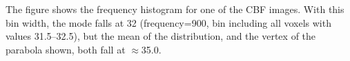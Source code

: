 \label{fig:smoothed_mode} The figure shows the frequency histogram for one of the CBF images. With this bin width, the mode falls at 32 (frequency=900, bin including all voxels with values 31.5--32.5), but the mean of the distribution, and the vertex of the parabola shown, both fall at $\approx$35.0.